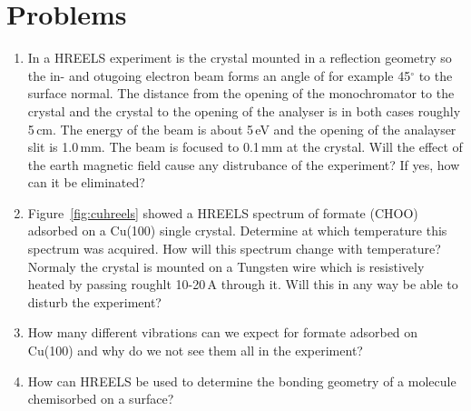 \section{Problems}
\begin{enumerate}
\item In a HREELS experiment is the crystal mounted in a reflection geometry so the in- and otugoing electron beam forms an angle of for example 45$^\circ$ to the surface normal. The distance from the opening of the monochromator to the crystal and the crystal to the opening of the analyser is in both cases roughly 5\,cm. The energy of the beam is about 5\,eV and the opening of the analayser slit is 1.0\,mm. The beam is focused to 0.1\,mm at the crystal. Will the effect of the earth magnetic field cause any distrubance of the experiment? If yes, how can it be eliminated?

\item Figure~\autoref{fig:cuhreels} showed a HREELS spectrum of formate (CHOO) adsorbed on a Cu(100) single crystal. Determine at which temperature this spectrum was acquired. How will this spectrum change with temperature? Normaly the crystal is mounted on a Tungsten wire which is resistively heated by passing roughlt 10-20\,A through it. Will this in any way be able to disturb the experiment?

\item How many different vibrations can we expect for formate adsorbed on Cu(100) and why do we not see them all in the experiment?

\item How can HREELS be used to determine the bonding geometry of a molecule chemisorbed on a surface?
\end{enumerate}

